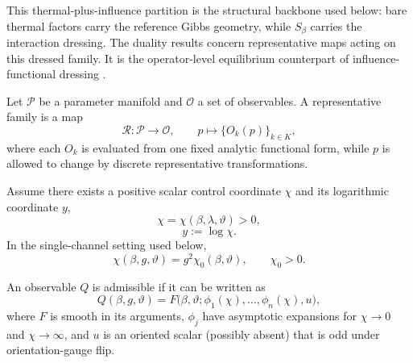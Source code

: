 This thermal-plus-influence partition is the structural backbone used below: bare thermal factors
carry the reference Gibbs geometry, while \(S_\beta\) carries the interaction dressing. The duality
results concern representative maps acting on this dressed family. It is the operator-level
equilibrium counterpart of influence-functional dressing
\cite{feynmanTheoryGeneralQuantum1963a,mccaulMeanForceHamiltoniansInfluence2026}.

\begin{definition}
\label{def:rep_family}
Let \(\mathcal{P}\) be a parameter manifold and \(\mathcal{O}\) a set of observables. A
representative family is a map
\begin{equation}
  \mathcal{R}: \mathcal{P}\to \mathcal{O}, \qquad
  p \mapsto \{O_k(p)\}_{k\in K},
\end{equation}
where each \(O_k\) is evaluated from one fixed analytic functional form, while \(p\) is allowed
to change by discrete representative transformations.
\end{definition}

\begin{definition}
Assume there exists a positive scalar control coordinate \(\chi\) and its logarithmic coordinate
\(y\),
\begin{equation}
  \chi = \chi(\beta,\lambda,\vartheta) > 0,
\end{equation}
\begin{equation}
  y := \log \chi.
\end{equation}
In the single-channel setting used below,
\begin{equation}
  \chi(\beta,g,\vartheta)=g^2\chi_0(\beta,\vartheta), \qquad \chi_0>0.
\end{equation}
\end{definition}

\begin{definition}
\label{def:admissible_class}
An observable \(Q\) is admissible if it can be written as
\begin{equation}
  Q(\beta,g,\vartheta)=F\!\bigl(\beta,\vartheta;\phi_1(\chi),\ldots,\phi_n(\chi),u\bigr),
\end{equation}
where \(F\) is smooth in its arguments, \(\phi_j\) have asymptotic expansions for
\(\chi\to 0\) and \(\chi\to\infty\), and \(u\) is an oriented scalar (possibly absent) that is odd
under orientation-gauge flip.
\end{definition}

